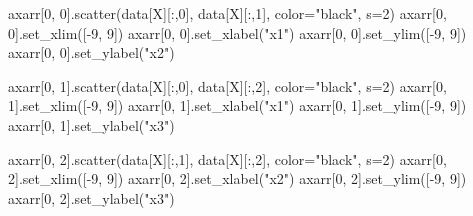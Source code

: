 \documentclass[
  letterpaper,
  DIV=11,
  numbers=noendperiod]{scrartcl}
\newenvironment{Shaded}{\begin{snugshade}}{\end{snugshade}}
\newcommand{\DecValTok}[1]{\textcolor[rgb]{0.68,0.00,0.00}{#1}}
\newcommand{\NormalTok}[1]{\textcolor[rgb]{0.00,0.23,0.31}{#1}}
\newcommand{\OperatorTok}[1]{\textcolor[rgb]{0.37,0.37,0.37}{#1}}
\newcommand{\StringTok}[1]{\textcolor[rgb]{0.13,0.47,0.30}{#1}}
\begin{document}
\begin{Shaded}
\begin{Highlighting}[]
\NormalTok{axarr[}\DecValTok{0}\NormalTok{, }\DecValTok{0}\NormalTok{].scatter(data[}\StringTok{\textquotesingle{}X\textquotesingle{}}\NormalTok{][:,}\DecValTok{0}\NormalTok{], data[}\StringTok{\textquotesingle{}X\textquotesingle{}}\NormalTok{][:,}\DecValTok{1}\NormalTok{], color}\OperatorTok{=}\StringTok{"black"}\NormalTok{, s}\OperatorTok{=}\DecValTok{2}\NormalTok{)}
\NormalTok{axarr[}\DecValTok{0}\NormalTok{, }\DecValTok{0}\NormalTok{].set\_xlim([}\OperatorTok{{-}}\DecValTok{9}\NormalTok{, }\DecValTok{9}\NormalTok{])}
\NormalTok{axarr[}\DecValTok{0}\NormalTok{, }\DecValTok{0}\NormalTok{].set\_xlabel(}\StringTok{"x1"}\NormalTok{)}
\NormalTok{axarr[}\DecValTok{0}\NormalTok{, }\DecValTok{0}\NormalTok{].set\_ylim([}\OperatorTok{{-}}\DecValTok{9}\NormalTok{, }\DecValTok{9}\NormalTok{])}
\NormalTok{axarr[}\DecValTok{0}\NormalTok{, }\DecValTok{0}\NormalTok{].set\_ylabel(}\StringTok{"x2"}\NormalTok{)}

\NormalTok{axarr[}\DecValTok{0}\NormalTok{, }\DecValTok{1}\NormalTok{].scatter(data[}\StringTok{\textquotesingle{}X\textquotesingle{}}\NormalTok{][:,}\DecValTok{0}\NormalTok{], data[}\StringTok{\textquotesingle{}X\textquotesingle{}}\NormalTok{][:,}\DecValTok{2}\NormalTok{], color}\OperatorTok{=}\StringTok{"black"}\NormalTok{, s}\OperatorTok{=}\DecValTok{2}\NormalTok{)}
\NormalTok{axarr[}\DecValTok{0}\NormalTok{, }\DecValTok{1}\NormalTok{].set\_xlim([}\OperatorTok{{-}}\DecValTok{9}\NormalTok{, }\DecValTok{9}\NormalTok{])}
\NormalTok{axarr[}\DecValTok{0}\NormalTok{, }\DecValTok{1}\NormalTok{].set\_xlabel(}\StringTok{"x1"}\NormalTok{)}
\NormalTok{axarr[}\DecValTok{0}\NormalTok{, }\DecValTok{1}\NormalTok{].set\_ylim([}\OperatorTok{{-}}\DecValTok{9}\NormalTok{, }\DecValTok{9}\NormalTok{])}
\NormalTok{axarr[}\DecValTok{0}\NormalTok{, }\DecValTok{1}\NormalTok{].set\_ylabel(}\StringTok{"x3"}\NormalTok{)}

\NormalTok{axarr[}\DecValTok{0}\NormalTok{, }\DecValTok{2}\NormalTok{].scatter(data[}\StringTok{\textquotesingle{}X\textquotesingle{}}\NormalTok{][:,}\DecValTok{1}\NormalTok{], data[}\StringTok{\textquotesingle{}X\textquotesingle{}}\NormalTok{][:,}\DecValTok{2}\NormalTok{], color}\OperatorTok{=}\StringTok{"black"}\NormalTok{, s}\OperatorTok{=}\DecValTok{2}\NormalTok{)}
\NormalTok{axarr[}\DecValTok{0}\NormalTok{, }\DecValTok{2}\NormalTok{].set\_xlim([}\OperatorTok{{-}}\DecValTok{9}\NormalTok{, }\DecValTok{9}\NormalTok{])}
\NormalTok{axarr[}\DecValTok{0}\NormalTok{, }\DecValTok{2}\NormalTok{].set\_xlabel(}\StringTok{"x2"}\NormalTok{)}
\NormalTok{axarr[}\DecValTok{0}\NormalTok{, }\DecValTok{2}\NormalTok{].set\_ylim([}\OperatorTok{{-}}\DecValTok{9}\NormalTok{, }\DecValTok{9}\NormalTok{])}
\NormalTok{axarr[}\DecValTok{0}\NormalTok{, }\DecValTok{2}\NormalTok{].set\_ylabel(}\StringTok{"x3"}\NormalTok{)}


\end{Highlighting}
\end{Shaded}
\end{document}
